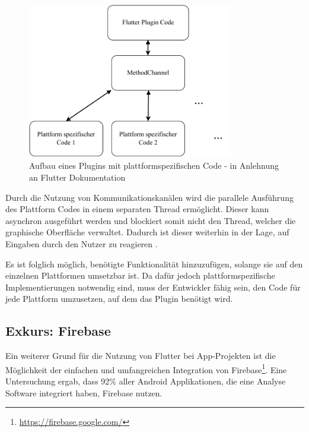 \begin{figure}[ht]
  \centering
  \includegraphics[width=9cm,keepaspectratio]{images/flutter_plattform_specific.pdf} 
  \caption[Aufbau eines Plugins mit plattformspezifischen Code]{Aufbau eines Plugins mit plattformspezifischen Code - in Anlehnung an Flutter Dokumentation\protect\footnotemark}
  \label{fig:flutter_plattform_specific}
\end{figure}


Durch die Nutzung von Kommunikationskanälen wird die parallele Ausführung des Plattform Codes in einem separaten Thread ermöglicht. Dieser kann asynchron ausgeführt werden und blockiert somit nicht den Thread, welcher die graphische Oberfläche verwaltet. Dadurch ist dieser weiterhin in der Lage, auf Eingaben durch den Nutzer zu reagieren \cite{plattform_code_flutter}.

Es ist folglich möglich, benötigte Funktionalität hinzuzufügen, solange sie auf den einzelnen Plattformen umsetzbar ist. Da dafür jedoch plattformspezifische Implementierungen notwendig sind, muss der Entwickler fähig sein, den Code für jede Plattform umzusetzen, auf dem das Plugin benötigt wird.

\subsection{Exkurs: Firebase}
Ein weiterer Grund für die Nutzung von Flutter bei App-Projekten ist die Möglichkeit der einfachen und umfangreichen Integration von Firebase\footnote{\url{https://firebase.google.com/}}. Eine Untersuchung \cite{statist_analytics_SDK} ergab, dass 92\% aller Android Applikationen, die eine Analyse Software integriert haben, Firebase nutzen.

